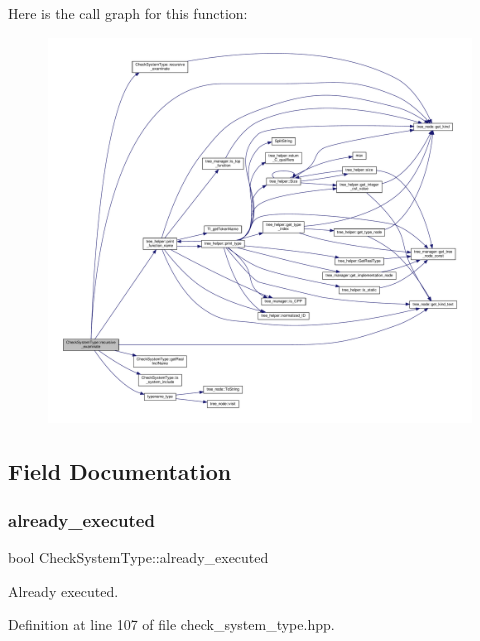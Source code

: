 Here is the call graph for this function\+:
\nopagebreak
\begin{figure}[H]
\begin{center}
\leavevmode
\includegraphics[width=350pt]{d9/df6/classCheckSystemType_abf10add839bdbde290f74ecd7561392a_cgraph}
\end{center}
\end{figure}


\subsection{Field Documentation}
\mbox{\label{classCheckSystemType_afbe5cfb1333e1a3d055503cbb35f8722}} 
\subsubsection{\texorpdfstring{already\+\_\+executed}{already\_executed}}
{\footnotesize\ttfamily bool Check\+System\+Type\+::already\+\_\+executed\hspace{0.3cm}{\ttfamily [private]}}



Already executed. 



Definition at line 107 of file check\+\_\+system\+\_\+type.\+hpp.



